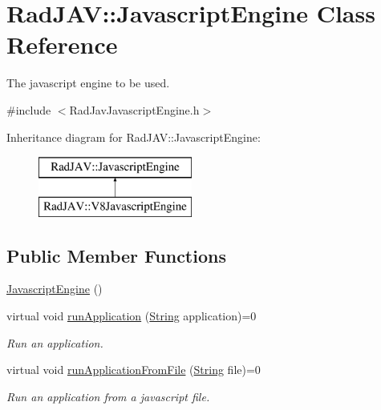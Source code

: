 \hypertarget{class_rad_j_a_v_1_1_javascript_engine}{}\section{Rad\+J\+AV\+:\+:Javascript\+Engine Class Reference}
\label{class_rad_j_a_v_1_1_javascript_engine}


The javascript engine to be used.  




{\ttfamily \#include $<$Rad\+Jav\+Javascript\+Engine.\+h$>$}

Inheritance diagram for Rad\+J\+AV\+:\+:Javascript\+Engine\+:\begin{figure}[H]
\begin{center}
\leavevmode
\includegraphics[height=2.000000cm]{class_rad_j_a_v_1_1_javascript_engine}
\end{center}
\end{figure}
\subsection*{Public Member Functions}
\begin{DoxyCompactItemize}
\item 
\hyperlink{class_rad_j_a_v_1_1_javascript_engine_a148c454c66e90614abbc589e715b3f7c}{Javascript\+Engine} ()
\item 
virtual void \hyperlink{class_rad_j_a_v_1_1_javascript_engine_acb5ff6a3eb18d8d550f480047cbc6420}{run\+Application} (\hyperlink{class_rad_j_a_v_1_1_string}{String} application)=0
\begin{DoxyCompactList}\small\item\em Run an application. \end{DoxyCompactList}\item 
virtual void \hyperlink{class_rad_j_a_v_1_1_javascript_engine_a0a435f458e118a813c95ccb359d546e9}{run\+Application\+From\+File} (\hyperlink{class_rad_j_a_v_1_1_string}{String} file)=0
\begin{DoxyCompactList}\small\item\em Run an application from a javascript file. \end{DoxyCompactList}\end{DoxyCompactItemize}


